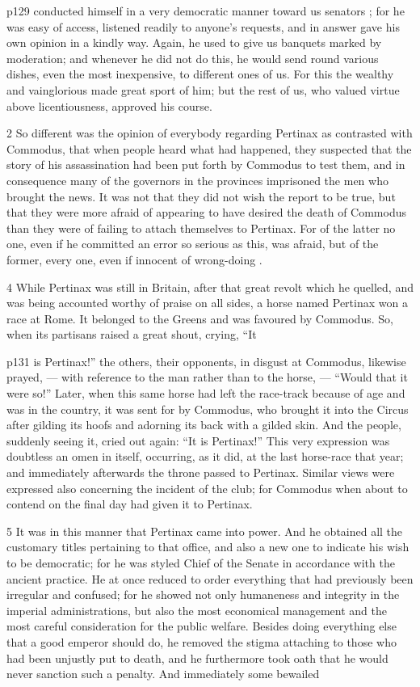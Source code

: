 p129 conducted himself in a very democratic manner toward us senators ; for he was easy of access, listened readily to anyone's requests, and in answer gave his own opinion in a kindly way. Again, he used to give us banquets marked by moderation; and whenever he did not do this, he would send round various dishes, even the most inexpensive, to different ones of us. For this the wealthy and vainglorious made great sport of him; but the rest of us, who valued virtue above licentiousness, approved his course.

2
So different was the opinion of everybody regarding Pertinax as contrasted with Commodus, that when people heard what had happened, they suspected that the story of his assassination had been put forth by Commodus to test them, and in consequence many of the governors in the provinces imprisoned the men who brought the news. It was not that they did not wish the report to be true, but that they were more afraid of appearing to have desired the death of Commodus than they were of failing to attach themselves to Pertinax. For of the latter no one, even if he committed an error so serious as this, was afraid, but of the former, every one, even if innocent of wrong-doing .

4
While Pertinax was still in Britain, after that great revolt which he quelled, and was being accounted worthy of praise on all sides, a horse named Pertinax won a race at Rome. It belonged to the Greens and was favoured by Commodus. So, when its partisans raised a great shout, crying, ``It

p131 is Pertinax!'' the others, their opponents, in disgust at Commodus, likewise prayed, \texthebrew{—} with reference to the man rather than to the horse, \texthebrew{—} ``Would that it were so!'' Later, when this same horse had left the race-track because of age and was in the country, it was sent for by Commodus, who brought it into the Circus after gilding its hoofs and adorning its back with a gilded skin. And the people, suddenly seeing it, cried out again: ``It is Pertinax!'' This very expression was doubtless an omen in itself, occurring, as it did, at the last horse-race that year; and immediately afterwards the throne passed to Pertinax. Similar views were expressed also concerning the incident of the club; for Commodus when about to contend on the final day had given it to Pertinax.

5
It was in this manner that Pertinax came into power. And he obtained all the customary titles pertaining to that office, and also a new one to indicate his wish to be democratic; for he was styled Chief of the Senate in accordance with the ancient practice. He at once reduced to order everything that had previously been irregular and confused; for he showed not only humaneness and integrity in the imperial administrations, but also the most economical management and the most careful consideration for the public welfare. Besides doing everything else that a good emperor should do, he removed the stigma attaching to those who had been unjustly put to death, and he furthermore took oath that he would never sanction such a penalty. And immediately some bewailed

